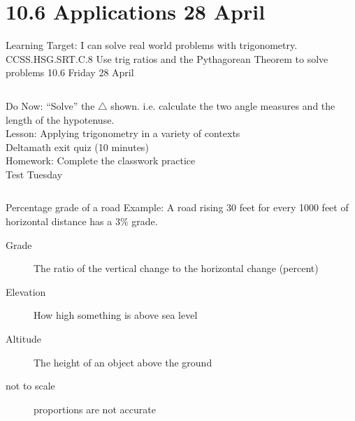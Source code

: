 \documentclass[onlytextwidth, aspectratio=169]{beamer}
\begin{document}
\section{10.6 Applications \hfill 28 April \,}
\begin{frame}{Learning Target: I can solve real world problems with trigonometry.}
  {CCSS.HSG.SRT.C.8 Use trig ratios and the Pythagorean Theorem to solve problems \hfill \alert{10.6 Friday 28 April}}
  \begin{columns}
    Do Now: ``Solve'' the $\triangle$ shown. i.e. calculate the two angle measures and the length of the hypotenuse. \\[0.5cm]
    Lesson: Applying trigonometry in a variety of contexts \\
    \alert{Deltamath exit quiz} (10 minutes) \\[0.5cm]
    Homework: Complete the classwork practice \\
    \alert{Test Tuesday}
    \begin{flushright}
    \end{flushright}
  \end{columns}
\end{frame}

\begin{frame}{Percentage grade of a road}
  Example: A road rising 30 feet for every 1000 feet of horizontal distance has a 3\% grade. \\[0.5cm]
  \begin{center}
  \end{center}
  \begin{description}
    \item[Grade] The ratio of the vertical change to the horizontal change (percent)
    \item[Elevation] How high something is above sea level
    \item[Altitude] The height of an object above the ground
    \item[not to scale] proportions are not accurate
  \end{description}
\end{frame}
\end{document}
